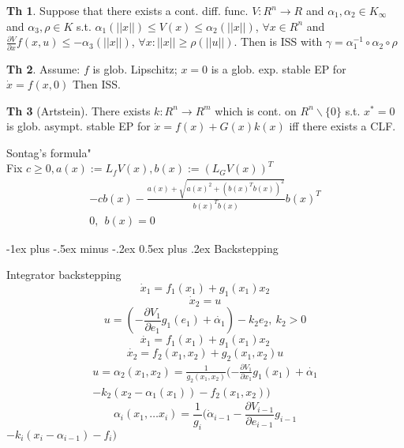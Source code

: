 \documentclass[9pt,landscape]{article}
\makeatletter
\theoremstyle{definition}
\newtheorem*{Theorem}{Th}
\renewcommand{\section}{\@startsection{section}{1}{0mm}%
                                {-1ex plus -.5ex minus -.2ex}%
                                {0.5ex plus .2ex}%
                                {\normalfont\large\bfseries}}
\makeatother
\begin{document}
\begin{multicols}{4}
\begin{Theorem}
 Suppose that there exists a cont. diff. func. 
 $V:R^n\to R$ and $\alpha_1,\alpha_2\in K_\infty$ and $\alpha_3, \rho \in K$
 s.t. $\alpha_1(||x||)\le V(x)\le\alpha_2(||x||)$, $\forall x\in R^n$ and
 $\frac{\partial V}{\partial x}f(x,u)\le-\alpha_3(||x||)$,
 $\forall x: ||x||\ge\rho(||u||)$. Then is ISS with 
 $\gamma = \alpha_1^{-1} \circ \alpha_2\circ\rho$
\end{Theorem}

\begin{Theorem}
 Assume:
 $f$ is glob. Lipschitz;
 $x = 0$ is a glob. exp. stable EP for $\dot x = f(x,0)$
 Then ISS.
\end{Theorem}

\begin{Theorem}[Artstein]
 There exists $k:R^n \to R^m$ which is cont. on $R^n \backslash \{ 0 \}$ s.t. $x^*=0$ is glob. asympt. stable EP for $\dot x = f(x)+G(x)k(x)$ iff there exists a CLF.
\end{Theorem}

Sontag's formula" \\
Fix $c \ge 0, a(x):=L_fV(x), b(x):=(L_GV(x))^T$
$$
                \begin{array}{ll}
                  -cb(x)-\frac{a(x)+\sqrt{a(x)^2+(b(x)^Tb(x))^2}}{b(x)^Tb(x)}b(x)^T \\
                  0, \ \ b(x)=0
                \end{array}
              $$

\section{Backstepping}

Integrator backstepping 
\begin{equation*}\label{system_backstepping}
\dot x_1 = f_1(x_1) + g_1(x_1)x_2 
\end{equation*}
\begin{equation*}
\dot x_2 = u
\end{equation*}
\begin{equation*}\label{u_choice}
u = (- \frac{\partial V_1}{\partial e_1}g_1(e_1) + \dot{\alpha_1})- k_2e_2 , \ k_2 > 0
\end{equation*}
\begin{equation*}
\dot{x_1} = f_1(x_1) + g_1(x_1)x_2
\end{equation*}
\begin{equation*}
\dot{x_2} = f_2(x_1, x_2) + g_2(x_1,x_2)u
\end{equation*}
\begin{equation*}
\begin{split}
u = \alpha_2(x_1, x_2) = \frac{1}{g_2(x_1,x_2)}(-\frac{\partial V_1}{\partial x_1}g_1(x_1) + \dot{\alpha_1}  \\ 
- k_2(x_2 - \alpha_1(x_1)) - f_2(x_1, x_2))
\end{split}
\end{equation*} 
$$\alpha_i(x_1, \dots x_i) = \frac{1}{g_i}(\dot \alpha_{i-1} - \frac{\partial V_{i-1}}{\partial e_{i-1}}g_{i-1}$$
$-k_i(x_i-\alpha_{i-1})-f_i)$


\end{multicols}
\end{document}
